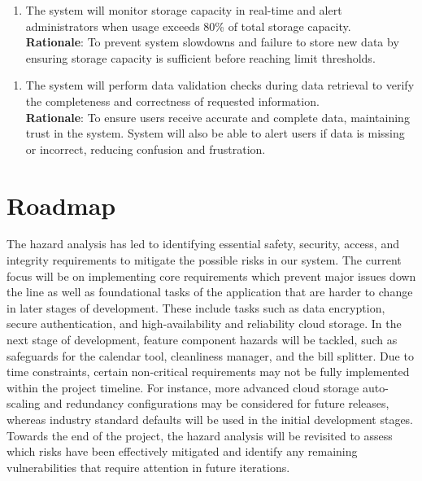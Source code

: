 \documentclass[12pt, titlepage]{article}
\begin{document}
\begin{enumerate}[{IR}6. ]
    \item The system will monitor storage capacity in real-time and alert administrators when usage exceeds 80\% of total storage capacity.\\
    \textbf{Rationale}:  To prevent system slowdowns and failure to store new data by ensuring storage capacity is sufficient before reaching limit thresholds.
\end{enumerate} 
\begin{enumerate}[{IR}7. ]
    \item The system will perform data validation checks during data retrieval to verify the completeness and correctness of requested information.\\
    \textbf{Rationale}:  To ensure users receive accurate and complete data, maintaining trust in the system. System will also be able to alert users if data is missing or incorrect, reducing confusion and frustration.
\end{enumerate} 

\newpage

\section{Roadmap}

The hazard analysis has led to identifying essential safety, security, access, and integrity requirements to mitigate the possible risks in our system. The current focus will be on implementing core requirements which prevent major issues down the line as well as foundational tasks of the application that are harder to change in later stages of development. These include tasks such as data encryption, secure authentication, and high-availability and reliability cloud storage. In the next stage of development, feature component hazards will be tackled, such as safeguards for the calendar tool, cleanliness manager, and the bill splitter. Due to time constraints, certain non-critical requirements may not be fully implemented within the project timeline. For instance, more advanced cloud storage auto-scaling and redundancy configurations may be considered for future releases, whereas industry standard defaults will be used in the initial development stages. Towards the end of the project, the hazard analysis will be revisited to assess which risks have been effectively mitigated and identify any remaining vulnerabilities that require attention in future iterations.
\end{document}
